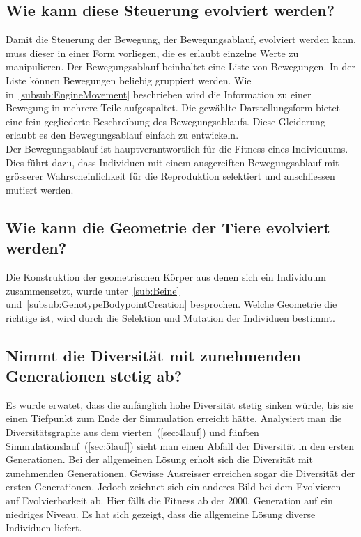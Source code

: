     \subsection{Wie kann diese Steuerung evolviert werden?}

      Damit die Steuerung der Bewegung, der Bewegungsablauf, evolviert werden kann,
      muss dieser in einer Form vorliegen, die es erlaubt einzelne Werte zu manipulieren.
      Der Bewegungsablauf beinhaltet eine Liste von Bewegungen.
      In der Liste können Bewegungen beliebig gruppiert werden.
      Wie in~\vref{subsub:EngineMovement} beschrieben
      wird die Information zu einer Bewegung in mehrere Teile aufgespaltet.
      Die gewählte Darstellungsform bietet eine fein gegliederte Beschreibung des Bewegungsablaufs.
      Diese Gleiderung erlaubt es den Bewegungsablauf einfach zu entwickeln.
      \\
      Der Bewegungsablauf ist hauptverantwortlich für die Fitness eines Individuums.
      Dies führt dazu, dass Individuen mit einem ausgereiften Bewegungsablauf mit grösserer Wahrscheinlichkeit
      für die Reproduktion selektiert und anschliessen mutiert werden.
      \\

    \subsection{Wie kann die Geometrie der Tiere evolviert werden?}

      Die Konstruktion der geometrischen Körper aus denen sich ein Individuum zusammensetzt,
      wurde unter~\vref{sub:Beine} und~\vref{subsub:GenotypeBodypointCreation} besprochen.
      Welche Geometrie die richtige ist, wird durch die Selektion und Mutation der Individuen bestimmt.

    \subsection{Nimmt die Diversität mit zunehmenden Generationen stetig ab?}
      Es wurde erwatet, dass die anfänglich hohe Diversität stetig sinken würde, bis sie einen Tiefpunkt zum Ende der Simmulation erreicht hätte.
      Analysiert man die Diversitätsgraphe aus dem vierten~(\vref{sec:4lauf}) und
      fünften Simmulationslauf~(\vref{sec:5lauf}) sieht man einen Abfall der Diversität in den ersten Generationen.
      Bei der allgemeinen Lösung erholt sich die Diversität mit zunehmenden Generationen.
      Gewisse Ausreisser erreichen sogar die Diversität der ersten Generationen.
      Jedoch zeichnet sich ein anderes Bild bei dem Evolvieren auf Evolvierbarkeit ab.
      Hier fällt die Fitness ab der 2000. Generation auf ein niedriges Niveau.
      Es hat sich gezeigt, dass die allgemeine Lösung diverse Individuen liefert.

